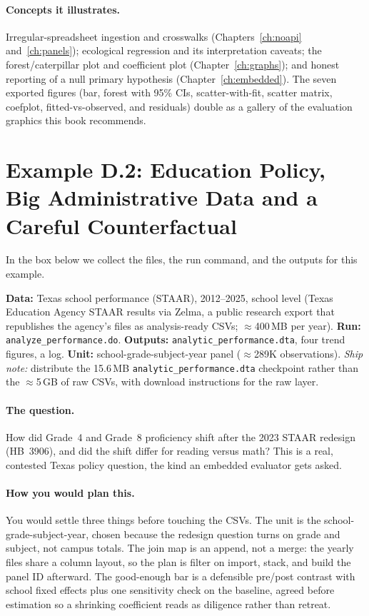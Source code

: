 \documentclass[
    a4paper,
    fontsize=10pt,
    twoside=true,
    numbers=noenddot,
]{kaobook}
\begin{document}
\paragraph{Concepts it illustrates.} Irregular-spreadsheet ingestion and crosswalks (Chapters~\ref{ch:noapi} and~\ref{ch:panels}); ecological regression and its interpretation caveats; the forest/caterpillar plot and coefficient plot (Chapter~\ref{ch:graphs}); and honest reporting of a null primary hypothesis (Chapter~\ref{ch:embedded}). The seven exported figures (bar, forest with 95\% CIs, scatter-with-fit, scatter matrix, coefplot, fitted-vs-observed, and residuals) double as a gallery of the evaluation graphics this book recommends.

\section*{Example D.2: Education Policy, Big Administrative Data and a Careful Counterfactual}
In the box below we collect the files, the run command, and the outputs for this example.
\begin{kaobox}[frametitle=Get the files: \texttt{edc-3.0-texas/}]
\textbf{Data:} Texas school performance (STAAR), 2012--2025, school level (Texas Education Agency STAAR results via Zelma, a public research export that republishes the agency's files as analysis-ready CSVs; $\approx$400\,MB per year).
\textbf{Run:} \texttt{analyze\_performance.do}. \textbf{Outputs:} \texttt{analytic\_performance.dta}, four trend figures, a log.
\textbf{Unit:} school-grade-subject-year panel ($\approx$289K observations). \emph{Ship note:} distribute the 15.6\,MB \texttt{analytic\_performance.dta} checkpoint rather than the $\approx$5\,GB of raw CSVs, with download instructions for the raw layer.
\end{kaobox}

\paragraph{The question.} How did Grade~4 and Grade~8 proficiency shift after the 2023 STAAR redesign (HB~3906), and did the shift differ for reading versus math? This is a real, contested Texas policy question, the kind an embedded evaluator gets asked.

\paragraph{How you would plan this.} You would settle three things before touching the CSVs. The unit is the school-grade-subject-year, chosen because the redesign question turns on grade and subject, not campus totals. The join map is an append, not a merge: the yearly files share a column layout, so the plan is filter on import, stack, and build the panel ID afterward. The good-enough bar is a defensible pre/post contrast with school fixed effects plus one sensitivity check on the baseline, agreed before estimation so a shrinking coefficient reads as diligence rather than retreat.
\end{document}
